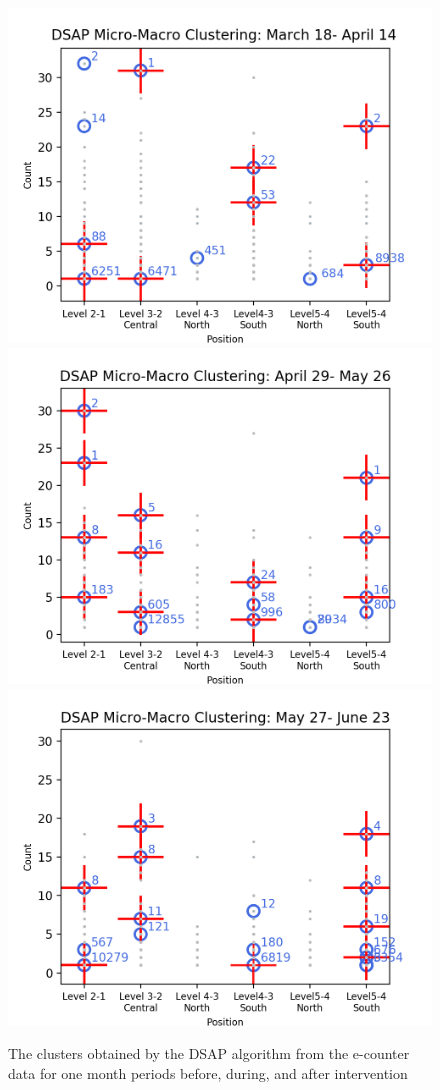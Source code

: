 \begin{figure}[!t]
    \centering
    \includegraphics[width=.47\textwidth]{image/Chapters/Chapter6/BeforeInte1month.png}
    \includegraphics[width=.47\textwidth]{image/Chapters/Chapter6/duringInte1month.png}
    \includegraphics[width=.47\textwidth]{image/Chapters/Chapter6/afterInte1month.png}
    \caption{The clusters obtained by the DSAP algorithm from the e-counter data for one month periods before, during, and after intervention}
    \label{dsap3mon}
\end{figure}








